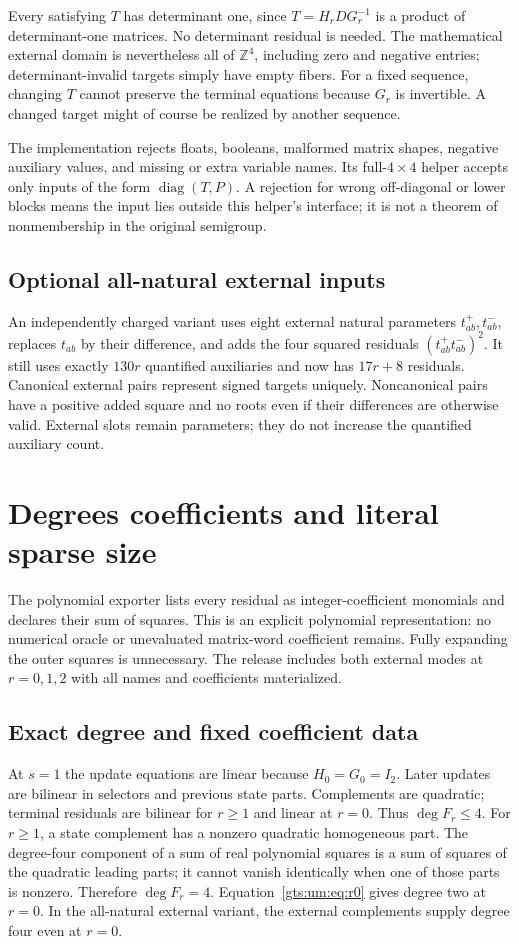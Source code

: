 \documentclass[11pt,letterpaper]{article}
\theoremstyle{definition}
\theoremstyle{remark}
\newcommand{\Z}{\mathbb Z}
\newcommand{\diag}{\operatorname{diag}}
\begin{document}
Every satisfying $T$ has determinant one, since $T=H_rDG_r^{-1}$ is a product of determinant-one matrices. No determinant residual is needed. The mathematical external domain is nevertheless all of $\Z^4$, including zero and negative entries; determinant-invalid targets simply have empty fibers. For a fixed sequence, changing $T$ cannot preserve the terminal equations because $G_r$ is invertible. A changed target might of course be realized by another sequence.

The implementation rejects floats, booleans, malformed matrix shapes, negative auxiliary values, and missing or extra variable names. Its full-$4\times4$ helper accepts only inputs of the form $\diag(T,P)$. A rejection for wrong off-diagonal or lower blocks means the input lies outside this helper's interface; it is not a theorem of nonmembership in the original semigroup.

\subsection{Optional all-natural external inputs}
An independently charged variant uses eight external natural parameters $t^+_{ab},t^-_{ab}$, replaces $t_{ab}$ by their difference, and adds the four squared residuals $(t^+_{ab}t^-_{ab})^2$. It still uses exactly $130r$ quantified auxiliaries and now has $17r+8$ residuals. Canonical external pairs represent signed targets uniquely. Noncanonical pairs have a positive added square and no roots even if their differences are otherwise valid. External slots remain parameters; they do not increase the quantified auxiliary count.

\section{Degrees coefficients and literal sparse size}
\label{gts:um:sec:size}
The polynomial exporter lists every residual as integer-coefficient monomials and declares their sum of squares. This is an explicit polynomial representation: no numerical oracle or unevaluated matrix-word coefficient remains. Fully expanding the outer squares is unnecessary. The release includes both external modes at $r=0,1,2$ with all names and coefficients materialized.

\subsection{Exact degree and fixed coefficient data}
At $s=1$ the update equations are linear because $H_0=G_0=I_2$. Later updates are bilinear in selectors and previous state parts. Complements are quadratic; terminal residuals are bilinear for $r\geq1$ and linear at $r=0$. Thus $\deg F_r\leq4$. For $r\geq1$, a state complement has a nonzero quadratic homogeneous part. The degree-four component of a sum of real polynomial squares is a sum of squares of the quadratic leading parts; it cannot vanish identically when one of those parts is nonzero. Therefore $\deg F_r=4$. Equation~\eqref{gts:um:eq:r0} gives degree two at $r=0$. In the all-natural external variant, the external complements supply degree four even at $r=0$.
\end{document}
